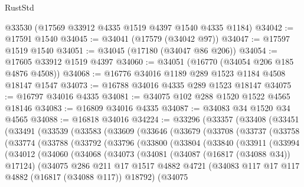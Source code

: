 \begin{lexlean}{RustStd}
\begin{coremodule}
    @33530
    (@17569 @33912 @4335 @1519 @4397 @1540 @4335 @1184)
@34042 := @17591 @1540
@34045 := @34041 (@17579 (@34042 @97))
@34047 := @17597 @1519 @1540
@34051 := @34045 (@17180 (@34047 @86 @206))
@34054 := @17605 @33912 @1519 @4397
@34060 := @34051 (@16770 (@34054 @206 @185 @4876 @4508))
@34068 := @16776 @34016 @1189 @289 @1523 @1184 @4508 @18147 @1547
@34073 := @16788 @34016 @4335 @289 @1523 @18147
@34075 := @16797 @34016 @4335
@34081 := @34075 @102 @288 @1520 @1522 @4565 @18146
@34083 := @16809 @34016 @4335
@34087 := @34083 @34 @1520 @34 @4565
@34088 := @16818 @34016
@34224 := @33296
    (@33357
      (@33408
        (@33451
          (@33491
            (@33539
              (@33583
                (@33609
                  (@33646
                    (@33679
                      (@33708
                        (@33737
                          (@33758
                            (@33774
                              (@33788
                                (@33792
                                  (@33796
                                    (@33800
                                      (@33804
                                        (@33840
                                          (@33911
                                            (@33994
                                              (@34012
                                                (@34060
                                                  (@34068
                                                    (@34073
                                                      (@34081
                                                        (@34087 (@16817 (@34088 @34)) @17124)
                                                        (@34075
                                                          @286
                                                          @211
                                                          @17
                                                          @1517
                                                          @4882
                                                          @4721
                                                          (@34083
                                                            @117
                                                            @17
                                                            @117
                                                            @4882
                                                            (@16817 (@34088 @117))
                                                            @18792)
                                                          (@34075

\end{coremodule}
\end{lexlean}
